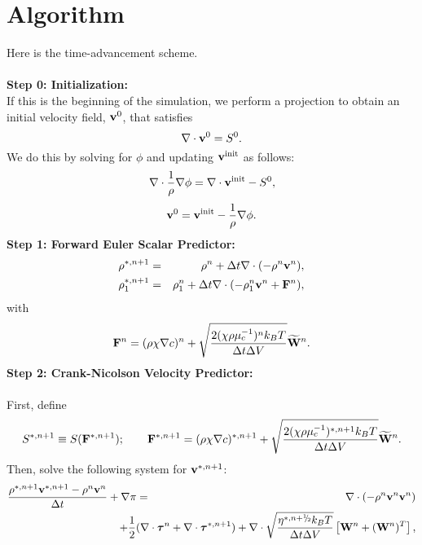 \documentclass[final]{siamltex}
\newcommand{\sfrac}[2]{\mathchoice
  {\kern0em\raise.5ex\hbox{\the\scriptfont0 #1}\kern-.15em/
   \kern-.15em\lower.25ex\hbox{\the\scriptfont0 #2}}
  {\kern0em\raise.5ex\hbox{\the\scriptfont0 #1}\kern-.15em/
   \kern-.15em\lower.25ex\hbox{\the\scriptfont0 #2}}
  {\kern0em\raise.5ex\hbox{\the\scriptscriptfont0 #1}\kern-.2em/
   \kern-.15em\lower.25ex\hbox{\the\scriptscriptfont0 #2}}
  {#1\!/#2}}
\def\Fb {{\bf F}}
\def\vb {{\bf v}}
\def\Wb {{\bf W}}
\def\taub {\boldsymbol{\tau}}
\def\half   {\frac{1}{2}}
\def\myhalf {\sfrac{1}{2}}
\begin{document}
\section{Algorithm}
Here is the time-advancement scheme.\\ \\
{\bf Step 0: Initialization:}\\

If this is the beginning of the simulation, we perform a projection to obtain an initial 
velocity field, $\vb^0$, that satisfies
\begin{equation}
\nabla\cdot\vb^0 = S^0.
\end{equation}
We do this by solving for $\phi$ and updating $\vb^{\rm init}$ as follows:
\begin{equation}
\nabla\cdot\frac{1}{\rho}\nabla\phi = \nabla\cdot\vb^{\rm init} - S^0,
\end{equation}
\begin{equation}
\vb^0 = \vb^{\rm init} - \frac{1}{\rho}\nabla\phi.
\end{equation}
{\bf Step 1: Forward Euler Scalar Predictor:}
\begin{eqnarray}
\rho^{*,n+1} &=& \rho^n + \Delta t\nabla\cdot(-\rho^n\vb^n),\\
\rho_1^{*,n+1} &=& \rho_1^n + \Delta t\nabla\cdot(-\rho_1^n\vb^n + \Fb^n),
\end{eqnarray}
with
\begin{equation}
\Fb^n = (\rho\chi\nabla c)^n + \sqrt{\frac{2(\chi\rho\mu_c^{-1})^nk_BT}{\Delta t\Delta V}}\widetilde\Wb^n.
\end{equation}
{\bf Step 2: Crank-Nicolson Velocity Predictor:}\\ \\
First, define
\begin{equation}
S^{*,n+1} \equiv S(\Fb^{*,n+1});
\qquad
\Fb^{*,n+1} = (\rho\chi\nabla c)^{*,n+1} + \sqrt{\frac{2(\chi\rho\mu_c^{-1})^{*,n+1}k_BT}{\Delta t\Delta V}}\widetilde\Wb^n.
\end{equation}
Then, solve the following system for $\vb^{*,n+1}$:
\begin{eqnarray}
\frac{\rho^{*,n+1}\vb^{*,n+1} - \rho^n\vb^n}{\Delta t} + \nabla\pi &=& \nabla\cdot(-\rho^n\vb^n\vb^n)\nonumber\\
&&\hspace{-0.5in}+ \half(\nabla\cdot\taub^n + \nabla\cdot\taub^{*,n+1}) + \nabla\cdot\sqrt{\frac{\eta^{*,n+\myhalf} k_B T}{\Delta t\Delta V}}\left[\Wb^n + (\Wb^n)^T\right],\label{eq:CN Vel Pred}
\end{eqnarray}
\end{document}
